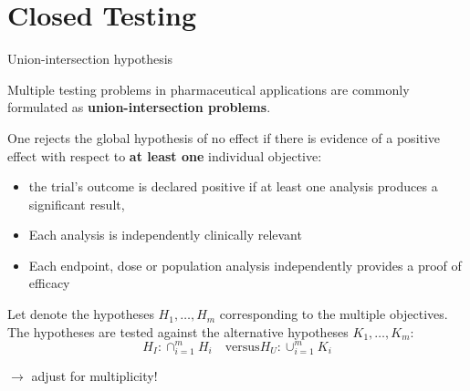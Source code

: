 \documentclass[xcolor={pdftex,dvipsnames,table}]{beamer}
\newcommand{\rbf}[1]{\textcolor{redUnipd}{ #1}}
\begin{document}
\section{Closed Testing}
\begin{frame}{Union-intersection hypothesis}

Multiple testing problems in pharmaceutical applications are commonly formulated as \textbf{\rbf{union-intersection problems}}.

One rejects the global hypothesis of no effect if there is evidence of a positive effect with respect to \textbf{at least one} individual objective:

\begin{itemize}
    \item the trial's outcome is declared positive if at least one analysis produces a significant result,
    \item Each analysis is independently clinically relevant
    \item Each endpoint, dose or population analysis independently provides a proof of efficacy
\end{itemize}

Let denote the hypotheses $H_1, \dots, H_m$ corresponding to the multiple objectives. The hypotheses are tested against the alternative hypotheses $K_1, \dots, K_m$:
\begin{equation*}
    H_I: \cap_{i = 1}^m H_i \quad \text{versus} H_U: \cup_{i=1}^m K_i
\end{equation*}

\bigskip

$\rightarrow$ adjust for multiplicity!

\end{frame}
\end{document}

